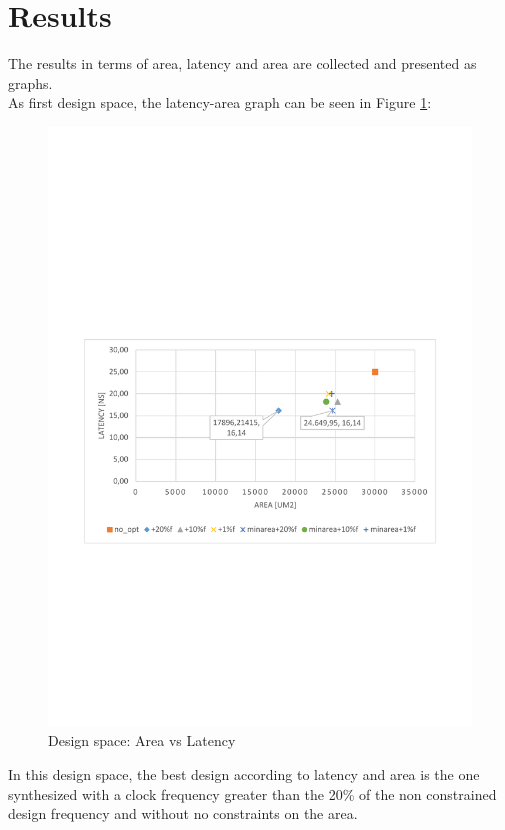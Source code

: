 \section{Results}
The results in terms of area, latency and area are collected and presented as graphs.\\
As first design space, the latency-area graph can be seen in Figure \ref{fig:lat_area}:
\begin{figure}[!htbp]
\centering
\captionsetup{justification=centering}
\includegraphics[scale=0.6,angle=0]{./chapters/files/latency_area.pdf}
\caption{Design space: Area \protect\footnotemark[1] vs Latency}
\label{fig:lat_area}
\end{figure}
In this design space, the best design according to latency and area is the one synthesized with a clock frequency greater than the 20\% of the non constrained design frequency and without no constraints on the area. 


